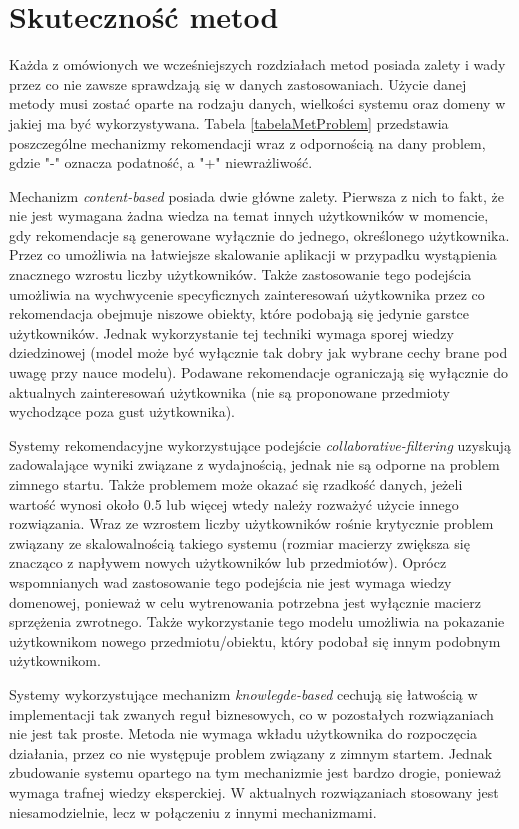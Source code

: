 \section{Skuteczność metod}

Każda z omówionych we wcześniejszych rozdziałach metod posiada zalety i wady przez co nie zawsze sprawdzają się w danych zastosowaniach. Użycie danej metody musi zostać oparte na rodzaju danych, wielkości systemu oraz domeny w jakiej ma być wykorzystywana. Tabela \ref{tabelaMetProblem} przedstawia poszczególne mechanizmy rekomendacji wraz z odpornością na dany problem, gdzie "-" oznacza podatność, a "+" niewrażliwość.

Mechanizm \textit{content-based} posiada dwie główne zalety. Pierwsza z nich to fakt, że nie jest wymagana żadna wiedza na temat innych użytkowników w momencie, gdy rekomendacje są generowane wyłącznie do jednego, określonego użytkownika. Przez co umożliwia na łatwiejsze skalowanie aplikacji w przypadku wystąpienia znacznego wzrostu liczby użytkowników. Także zastosowanie tego podejścia umożliwia na wychwycenie specyficznych zainteresowań użytkownika przez co rekomendacja obejmuje niszowe obiekty, które podobają się jedynie garstce użytkowników. Jednak wykorzystanie tej techniki wymaga sporej wiedzy dziedzinowej (model może być wyłącznie tak dobry jak wybrane cechy brane pod uwagę przy nauce modelu). Podawane rekomendacje ograniczają się wyłącznie do aktualnych zainteresowań użytkownika (nie są proponowane przedmioty wychodzące poza gust użytkownika).

Systemy rekomendacyjne wykorzystujące podejście \textit{collaborative-filtering} uzyskują zadowalające wyniki związane z wydajnością, jednak nie są odporne na problem zimnego startu. Także problemem może okazać się rzadkość danych, jeżeli wartość wynosi około 0.5 lub więcej wtedy należy rozważyć użycie innego rozwiązania. Wraz ze wzrostem liczby użytkowników rośnie krytycznie problem związany ze skalowalnością takiego systemu (rozmiar macierzy zwiększa się znacząco z napływem nowych użytkowników lub przedmiotów). Oprócz wspomnianych wad zastosowanie tego podejścia nie jest wymaga wiedzy domenowej, ponieważ w celu wytrenowania potrzebna jest wyłącznie macierz sprzężenia zwrotnego. Także wykorzystanie tego modelu umożliwia na pokazanie użytkownikom nowego przedmiotu/obiektu, który podobał się innym podobnym użytkownikom.

Systemy wykorzystujące mechanizm \textit{knowlegde-based} cechują się łatwością w implementacji tak zwanych reguł biznesowych, co w pozostałych rozwiązaniach nie jest tak proste. Metoda nie wymaga wkładu użytkownika do rozpoczęcia działania, przez co nie występuje problem związany z zimnym startem. Jednak zbudowanie systemu opartego na tym mechanizmie jest bardzo drogie, ponieważ wymaga trafnej wiedzy eksperckiej. W aktualnych rozwiązaniach stosowany jest niesamodzielnie, lecz w połączeniu z innymi mechanizmami.  \cite{reviewCurrentRS}

